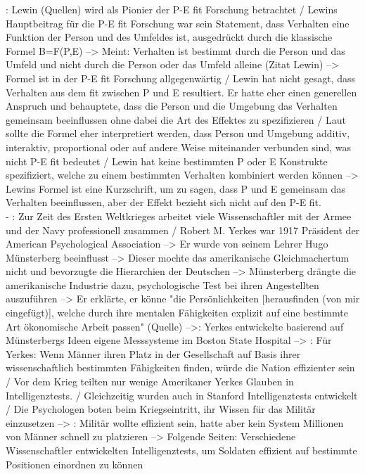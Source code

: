 \cite[S. 8]{edwards:2008}: Lewin (Quellen) wird als Pionier der P-E fit Forschung betrachtet / Lewins Hauptbeitrag für die P-E fit Forschung war sein Statement, dass Verhalten eine Funktion der Person und des Umfeldes ist, ausgedrückt durch die klassische Formel B=F(P,E) --> Meint: Verhalten ist bestimmt durch die Person und das Umfeld und nicht durch die Person oder das Umfeld alleine (Zitat Lewin) --> Formel ist in der P-E fit Forschung allgegenwärtig / Lewin hat nicht gesagt, dass Verhalten aus dem fit zwischen P und E resultiert. Er hatte eher einen generellen Anspruch und behauptete, dass die Person und die Umgebung das Verhalten gemeinsam beeinflussen ohne dabei die Art des Effektes zu spezifizieren / Laut \textcite{schneider:2001} sollte die Formel eher interpretiert werden, dass Person und Umgebung additiv, interaktiv, proportional oder auf andere Weise miteinander verbunden sind, was nicht P-E fit bedeutet / Lewin hat keine bestimmten P oder E Konstrukte spezifiziert, welche zu einem bestimmten Verhalten kombiniert werden können --> Lewins Formel ist eine Kurzschrift, um zu sagen, dass P und E gemeinsam das Verhalten beeinflussen, aber der Effekt bezieht sich nicht auf den P-E fit. \\
- \cite[S. 1]{kevles:1968}: Zur Zeit des Ersten Weltkrieges arbeitet viele Wissenschaftler mit der Armee und der Navy professionell zusammen / Robert M. Yerkes war 1917 Präsident der American Psychological Association --> Er wurde von seinem Lehrer Hugo Münsterberg beeinflusst --> Dieser mochte das amerikanische Gleichmachertum nicht und bevorzugte die Hierarchien der Deutschen --> Münsterberg drängte die amerikanische Industrie dazu, psychologische Test bei ihren Angestellten auszuführen --> Er erklärte, er könne "die Persönlichkeiten [herausfinden (von mir eingefügt)], welche durch ihre mentalen Fähigkeiten explizit auf eine bestimmte Art ökonomische Arbeit passen" (Quelle) -->\cite[S. 1f.]{kevles:1968}: Yerkes entwickelte basierend auf Münsterbergs Ideen eigene Messsysteme im Boston State Hospital --> \cite[S. 2]{kevles:1968}: Für Yerkes: Wenn Männer ihren Platz in der Gesellschaft auf Basis ihrer wissenschaftlich bestimmten Fähigkeiten finden, würde die Nation effizienter sein / Vor dem Krieg teilten nur wenige Amerikaner Yerkes Glauben in Intelligenztests. / Gleichzeitig wurden auch in Stanford Intelligenztests entwickelt / Die Psychologen boten beim Kriegseintritt, ihr Wissen für das Militär einzusetzen --> \cite[S. 3]{kevles:1968}: Militär wollte effizient sein, hatte aber kein System Millionen von Männer schnell zu platzieren --> Folgende Seiten: Verschiedene Wissenschaftler entwickelten Intelligenztests, um Soldaten effizient auf bestimmte Positionen einordnen zu können \\
